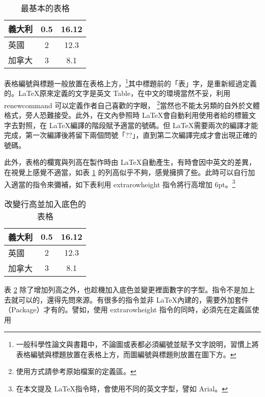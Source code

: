 \documentclass[12pt, a4paper]{article}
\begin{document}
\begin{table}[h] %
\centering
\caption{最基本的表格}\label{tb:basic_1}  %
\begin{tabular}{lcc}
    \hline
  義大利	& 0.5	& 16.12		\\\hline  %
  英國	& 2    	& 12.3		\\\hline
  加拿大	& 3    	& 8.1		\\\hline
\end{tabular}
\end{table}

表格編號與標題一般放置在表格上方，\footnote{一般科學性論文與書籍中，不論圖或表都必須編號並賦予文字說明，習慣上將表格編號與標題放置在表格上方，而圖編號與標題則放置在圖下方。}其中標題前的「表」字，是重新經過定義的。\LaTeX 原來定義的文字是英文 Table，在中文的環境當然不妥，利用 {\A renewcommand} 可以定義作者自己喜歡的字眼， \footnote{使用方式請參考原始檔案的定義區。}當然也不能太另類的自外於文體格式，旁人恐難接受。此外，在文內參照時 \LaTeX 會自動利用使用者給的標籤文字去對照，在 \LaTeX 編譯的階段賦予適當的號碼。但 \LaTeX 需要兩次的編譯才能完成，第一次編譯後將留下兩個問號「??」，直到第二次編譯完成才會出現正確的號碼。

此外，表格的欄寬與列高在製作時由 \LaTeX 自動產生，有時會因中英文的差異，在視覺上感覺不適當，如表 \ref{tb:basic_1} 的列高似乎不夠，感覺擁擠了些。此時可以自行加入適當的指令來彌補，如下表利用  {\A extrarowheight} 指令將行高增加  6pt。\footnote{在本文提及 \LaTeX 指令時，會使用不同的英文字型，譬如 {\A Arial}。}


\begin{table}[h]
\centering

\caption{改變行高並加入底色的表格}\label{tb:basic_row_color}  %
\extrarowheight=6pt   %
\colorbox{slight}{\begin{tabular}{lcc}
\hline
  義大利	& 0.5	& 16.12		\\\hline  %
  英國	& 2     	& 12.3		\\\hline
  加拿大 	& 3     	& 8.1		\\\hline
\end{tabular}}
\end{table}

表 \ref{tb:basic_row_color} 除了增加列高之外，也趁機加入底色並變更裡面數字的字型。指令不是加上去就可以的，還得先問來源。有很多的指令並非 \LaTeX 內建的，需要外加套件（Package）才有的。譬如，使用 {\A extrarowheight} 指令的同時，必須先在定義區使用
\end{document}
